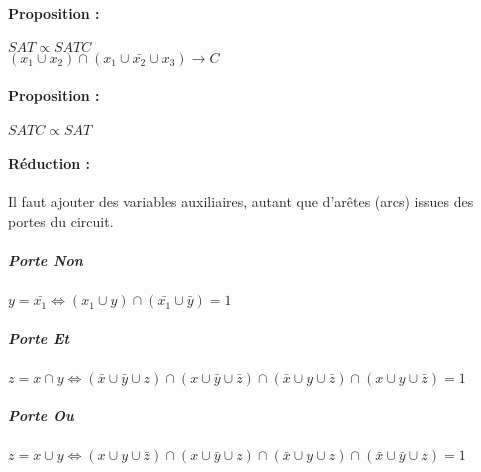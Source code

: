 \documentclass[12pt,a4paper]{report}
\begin{document}
\begin{figure}[h!]
	\centering
  \scalebox{0.5}{}
\end{figure}

\paragraph{Proposition :\\}
$SAT \propto SATC$ \\
$(x_1 \cup x_2) \cap (x_1 \cup \bar{x_2} \cup x_3) \longrightarrow C $

\begin{figure}[h!]
	\centering
  \scalebox{0.5}{}
\end{figure}

\paragraph{Proposition :\\}
$SATC \propto SAT $
\paragraph{Réduction :\\}
Il faut ajouter des variables auxiliaires, autant que d'arêtes (arcs) issues des portes du circuit.
\subparagraph{Porte Non\\}
$y=\bar{x_1} \Leftrightarrow (x_1\cup y) \cap (\bar{x_1} \cup \bar{y}) = 1 $

\begin{figure}[h!]
	\centering
  \scalebox{0.7}{}
\end{figure}

\subparagraph{Porte Et}
$z=x\cap y \Leftrightarrow (\bar{x} \cup \bar{y} \cup z) \cap (x \cup \bar{y} \cup \bar{z}) \cap (\bar{x} \cup y \cup \bar{z}) \cap (x \cup y \cup \bar{z}) = 1 $
 
\begin{figure}[h!]
	\centering
  \scalebox{0.7}{}
\end{figure}

\subparagraph{Porte Ou}
$z=x \cup y \Leftrightarrow (x\cup y \cup \bar{z}) \cap (x \cup \bar{y} \cup z) \cap(\bar{x} \cup y \cup z)\cap(\bar{x}\cup \bar{y} \cup z) =1 $

\begin{figure}[h]
	\centering
  \scalebox{0.7}{}
\end{figure}
\end{document}
